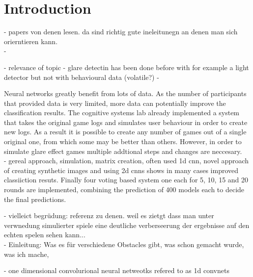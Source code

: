 \chapter{Introduction}
\label{introduction}



- papers von denen lesen. da sind richtig gute ineleitunegn an denen man sich orierntieren kann. \\
- 


- relevance of topic
- glare detectin has been done before with for example a light detector but not with behavioural data (volatile?) 
- 

Neural networks greatly benefit from lots of data. As the number of participants that provided data is very limited, more data can potentially improve the classification results.  The cognitive systems lab already implemented a system that takes the original game logs and simulates user behaviour in order to create new logs. As a result it is possible to create any number of games out of a single original one, from which some may be better than others. However, in order to simulate glare effect games multiple addtional steps and changes are neccesary. \\

- gereal approach, simulation, matrix creation, often used 1d cnn, novel approach of creating synthetic images and using 2d cnns shows in many cases improved classiiction resuts. 
Finally four voting based system one each for 5, 10, 15 and 20 rounds are implemented, combining the prediction of 400 models each to decide the final predictions.

- vielleict begrüdung: referenz zu denen. weil es zietgt dass man unter verwnedung simulierter spiele eine deutliche verberseerung der ergebnisse auf den echten spelen sehen kann...\\

- Einleitung: Was es für verschiedene Obstacles gibt, was schon gemacht wurde, was ich mache,

- one dimensional convolurional neural netweotks refered to as 1d convnets